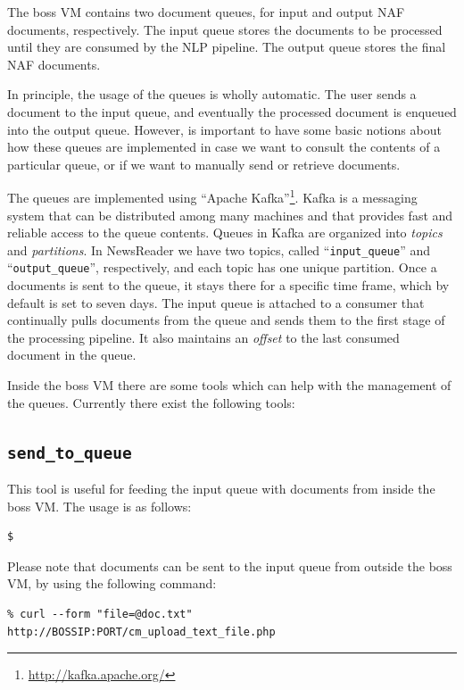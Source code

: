 \documentclass[a4]{article}
\begin{document}
The boss VM contains two document queues, for input and output NAF
documents, respectively. The input queue stores the documents to be
processed until they are consumed by the NLP pipeline. The output queue
stores the final NAF documents.

In principle, the usage of the queues is wholly automatic. The user sends a
document to the input queue, and eventually the processed document is
enqueued into the output queue. However, is important to have some basic
notions about how these queues are implemented in case we want to consult
the contents of a particular queue, or if we want to manually send or
retrieve documents.

The queues are implemented using ``Apache
Kafka''\footnote{\url{http://kafka.apache.org/}}. Kafka is a messaging
system that can be distributed among many machines and that provides fast
and reliable access to the queue contents. Queues in Kafka are organized
into \emph{topics} and \emph{partitions}. In NewsReader we have two topics,
called ``\texttt{input\_queue}'' and ``\texttt{output\_queue}'',
respectively, and each topic has one unique partition. Once a documents is
sent to the queue, it stays there for a specific time frame, which by
default is set to seven days. The input queue is attached to a consumer that
continually pulls documents from the queue and sends them to the first stage
of the processing pipeline. It also maintains an \emph{offset} to the last
consumed document in the queue.

Inside the boss VM there are some tools which can help with the management
of the queues. Currently there exist the following tools:

\subsection*{\texttt{send\_to\_queue}}
\label{sec:send-to-queue.pl}

This tool is useful for feeding the input queue with documents from inside
the \textrm{boss} VM. The usage is as follows:

\begin{verbatim}
$ 
\end{verbatim}

Please note that documents can be sent to the input queue from outside the
\textrm{boss} VM, by using the following command:

\begin{verbatim}
% curl --form "file=@doc.txt" http://BOSSIP:PORT/cm_upload_text_file.php
\end{verbatim}
\end{document}
